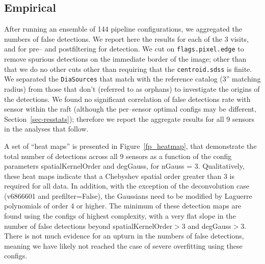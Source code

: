 \documentclass[prd, nofootinbib, floatfix, 11pt,tightenlines,times]{article}
\begin{document}
\subsection{Empirical}

After running an ensemble of 144 pipeline configurations, we
aggregated the numbers of false detections.  We report here the results for
each of the 3 visits, and for pre-- and postfiltering for
detection.  We cut on {\tt flags.pixel.edge} to remove spurious
detections on the immediate border of the image; other than that we do
no other cuts other than requiring that the {\tt centroid.sdss} is
finite.  We separated the {\tt DiaSources} that match with the reference
catalog (3'' matching radius) from those that don't (referred to as
orphans) to investigate the origins of the detections.  We found no
significant correlation of false detections rate with sensor within the
raft (although the per--sensor optimal configs may be different, Section~\ref{sec-resstats}); 
therefore we report the aggregate results for all 9 sensors in
the analyses that follow.

A set of ``heat maps'' is presented in Figure~\ref{fp_heatmap}, that
demonstrate the total number of detections across all 9 sensors as a
function of the config parameters spatialKernelOrder and degGauss, for
nGauss = 3.  Qualitatively, these heat maps indicate that a Chebyshev
spatial order greater than 3 is required for all data.  In addition,
with the exception of the deconvolution case (v6866601 and
prefilter=False), the Gaussians need to be modified by Laguerre
polynomials of order 4 or higher.  The minimum of these detection maps
are found using the configs of highest complexity, with a very flat
slope in the number of false detections beyond spatialKernelOrder$>$3
and degGauss$>$3.  There is not much evidence for an upturn in the
numbers of false detections, meaning we have likely not reached the
case of severe overfitting using these configs.
\end{document}
